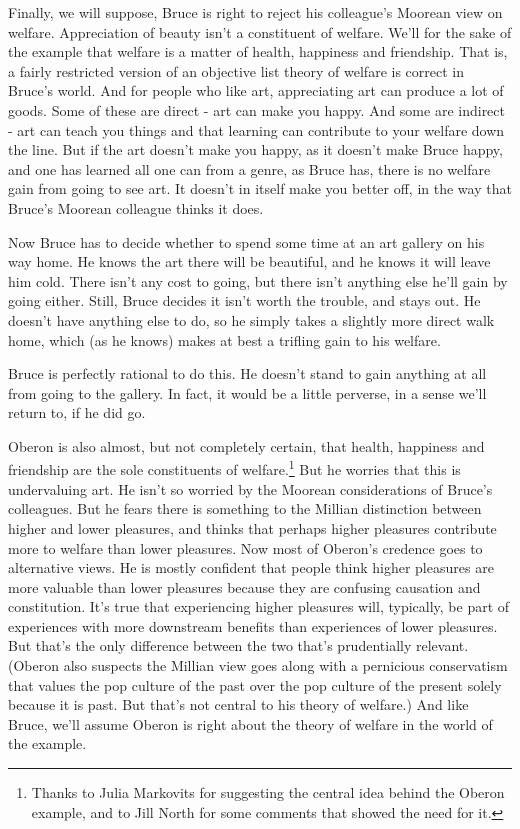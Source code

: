 \documentclass[
  10pt,
  letterpaper,
  twoside]{scrbook}
\begin{document}
Finally, we will suppose, {Bruce} is right to reject his colleague's
Moorean view on welfare. Appreciation of beauty isn't a constituent of
welfare. We'll for the sake of the example that welfare is a matter of
health, happiness and friendship. That is, a fairly restricted version
of an objective list theory of welfare is correct in {Bruce}'s world.
And for people who like art, appreciating art can produce a lot of
goods. Some of these are direct - art can make you happy. And some are
indirect - art can teach you things and that learning can contribute to
your welfare down the line. But if the art doesn't make you happy, as it
doesn't make {Bruce} happy, and one has learned all one can from a
genre, as {Bruce} has, there is no welfare gain from going to see art.
It doesn't in itself make you better off, in the way that {Bruce}'s
Moorean colleague thinks it does.

Now {Bruce} has to decide whether to spend some time at an art gallery
on his way home. He knows the art there will be beautiful, and he knows
it will leave him cold. There isn't any cost to going, but there isn't
anything else he'll gain by going either. Still, {Bruce} decides it
isn't worth the trouble, and stays out. He doesn't have anything else to
do, so he simply takes a slightly more direct walk home, which (as he
knows) makes at best a trifling gain to his welfare.

{Bruce} is perfectly rational to do this. He doesn't stand to gain
anything at all from going to the gallery. In fact, it would be a little
perverse, in a sense we'll return to, if he did go.

{Oberon} is also almost, but not completely certain, that health,
happiness and friendship are the sole constituents of
welfare.\footnote{Thanks to Julia Markovits for suggesting the central
  idea behind the Oberon example, and to Jill North for some comments
  that showed the need for it.} But he worries that this is undervaluing
art. He isn't so worried by the Moorean considerations of {Bruce}'s
colleagues. But he fears there is something to the Millian distinction
between higher and lower pleasures, and thinks that perhaps higher
pleasures contribute more to welfare than lower pleasures. Now most of
{Oberon}'s credence goes to alternative views. He is mostly confident
that people think higher pleasures are more valuable than lower
pleasures because they are confusing causation and constitution. It's
true that experiencing higher pleasures will, typically, be part of
experiences with more downstream benefits than experiences of lower
pleasures. But that's the only difference between the two that's
prudentially relevant. (Oberon also suspects the Millian view goes along
with a pernicious conservatism that values the pop culture of the past
over the pop culture of the present solely because it is past. But
that's not central to his theory of welfare.) And like {Bruce}, we'll
assume {Oberon} is right about the theory of welfare in the world of the
example.
\end{document}
